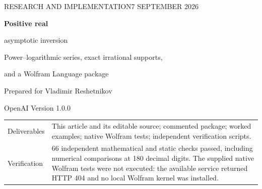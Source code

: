 \documentclass[11pt,a4paper]{article}
\numberwithin{equation}{section}
\theoremstyle{definition}
\newcommand{\R}{\mathbb R}
\begin{document}
\begin{titlepage}
\thispagestyle{empty}
\noindent\textcolor{accent}{\sffamily RESEARCH AND IMPLEMENTATION\hfill 7 SEPTEMBER 2026}\par
\vspace{18mm}
{\raggedright\huge\bfseries Positive real\par asymptotic inversion\par}
\vspace{5mm}
{\raggedright\Large Power--logarithmic series, exact irrational supports,\par and a Wolfram Language package\par}
\vspace{11mm}
\noindent Prepared for Vladimir Reshetnikov\par
\noindent OpenAI \quad\textbullet\quad Version 1.0.0
\vspace{10mm}
\begin{abstract}
The real inverse of $x+x^2(1+\log x)$ at $0^+$ is not a Taylor series,
and the inverse of $x+x^{\sqrt2}$ does not have a rational Puiseux support.
Both nevertheless admit a systematic, branch-explicit inversion calculus.
We develop it for every exact finite model
\[
 f(x)=a x^p+\sum_{j=1}^m x^{p+\eta_j}P_j(\log x),
 \qquad a,p,\eta_j>0,\quad P_j\in\R[L].
\]
After the positive substitution $v=x^p$, a local Lagrange--B\"urmann
formula gives every inverse coefficient as a finite product of first-order
operators on logarithmic polynomials. The output powers lie on a finitely
generated positive real semigroup, so irrational exponents and resonances
can be handled exactly. We prove branch existence and uniqueness, convergence
of the expansion for sufficiently small positive arguments, and a
next-weight remainder theorem that retains necessary powers of $\log y$.
An independent composition procedure checks the computed coefficients,
with the correct residual-to-inverse error conversion for $p\ne1$.
The accompanying package implements this finite-model theory, exposes
explicit remainder scales, and supplies a more general derivative-form
helper without pretending to certify its analytic hypotheses.
\end{abstract}
\vfill
\noindent\begin{tabular}{@{}p{}p{}@{}}
\toprule
Deliverables & This article and its editable source; commented package;
worked examples; native Wolfram tests; independent verification scripts.\\[4pt]
Verification & 66 independent mathematical and static checks passed,
including numerical comparisons at 180 decimal digits. The supplied
native Wolfram tests were not executed: the available service returned
HTTP 404 and no local Wolfram kernel was installed.\\
\bottomrule
\end{tabular}
\end{titlepage}
\tableofcontents
\clearpage
\end{document}
